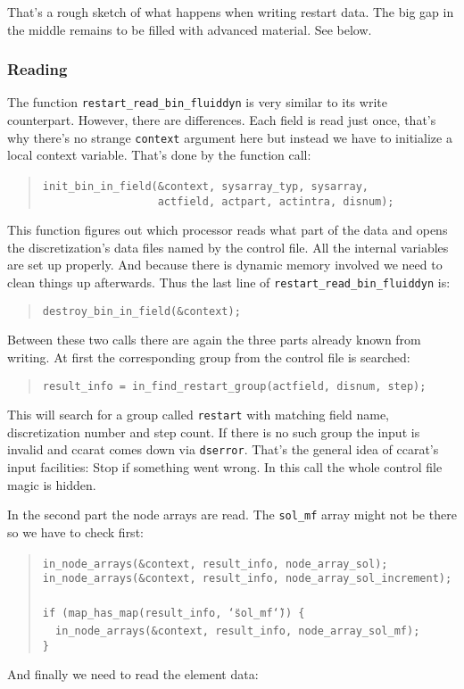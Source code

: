 That's a rough sketch of what happens when writing restart data. The
big gap in the middle remains to be filled with advanced material.
See below.


\subsubsection{Reading}

The function \texttt{restart{\_}read{\_}bin{\_}fluiddyn} is
very similar to its write counterpart. However, there are differences.
Each field is read just once, that's why there's no strange \texttt{context}
argument here but instead we have to initialize a local context variable.
That's done by the function call: 

\begin{quote}
\texttt{init{\_}bin{\_}in{\_}field({\&}context,~sysarray{\_}typ,~sysarray,~}~\\
 \texttt{~~~~~~~~~~~~~~~~~~actfield,~actpart,~actintra,~disnum); }
\end{quote}
This function figures out which processor reads what part of the data
and opens the discretization's data files named by the control file.
All the internal variables are set up properly. And because there
is dynamic memory involved we need to clean things up afterwards.
Thus the last line of \texttt{restart{\_}read{\_}bin{\_}fluiddyn}
is: 

\begin{quote}
\texttt{destroy{\_}bin{\_}in{\_}field({\&}context); }
\end{quote}
Between these two calls there are again the three parts already known
from writing. At first the corresponding group from the control file
is searched: 

\begin{quote}
\texttt{result{\_}info~=~in{\_}find{\_}restart{\_}group(actfield,~disnum,~step); }
\end{quote}
This will search for a group called \texttt{restart} with matching
field name, discretization number and step count. If there is no such
group the input is invalid and ccarat comes down via \texttt{dserror}.
That's the general idea of ccarat's input facilities: Stop if something
went wrong. In this call the whole control file magic is hidden.

In the second part the node arrays are read. The \texttt{sol{\_}mf}
array might not be there so we have to check first: 

\begin{quote}
\texttt{in{\_}node{\_}arrays({\&}context,~result{\_}info,~node{\_}array{\_}sol);~}~\\
 \texttt{in{\_}node{\_}arrays({\&}context,~result{\_}info,~node{\_}array{\_}sol{\_}increment);~}~\\
 \texttt{if~(map{\_}has{\_}map(result{\_}info,~\char`\"{}sol{\_}mf\char`\"{}))~{\{}~}~\\
 \texttt{~~in{\_}node{\_}arrays({\&}context,~result{\_}info,~node{\_}array{\_}sol{\_}mf);~}~\\
 \texttt{{\}} }
\end{quote}
And finally we need to read the element data: 

